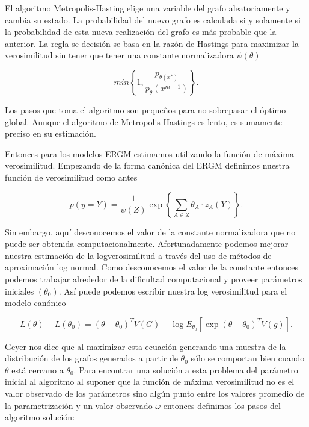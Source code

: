 El algoritmo Metropolis-Hasting elige una variable del grafo aleatoriamente y cambia su estado. La probabilidad del nuevo grafo es calculada si y solamente si la probabilidad de esta nueva realización del grafo es más probable que la anterior. La regla se decisión se basa en la razón de Hastings para maximizar la verosimilitud sin tener que tener una constante normalizadora $\psi(\theta)$

\begin{equation*}
    min \left\{1, \dfrac{p_{\theta(x^{*})}}{p_{\theta}(x^{m-1})}\right\}.
\end{equation*}

Los pasos que toma el algoritmo son pequeños para no sobrepasar el óptimo global. Aunque el algoritmo de Metropolis-Hastings es lento, es sumamente preciso en su estimación. 

Entonces para los modelos ERGM estimamos utilizando la función de máxima verosimilitud. Empezando de la forma canónica del ERGM definimos nuestra función de verosimilitud como antes

\begin{equation}
    p(y=Y)=\frac{1}{\psi(Z)} \exp \left\{\sum_{A \in Z} \theta_{A} \cdot z_{A}(Y)\right\}.
\end{equation}

Sin embargo, aquí desconocemos el valor de la constante normalizadora que no puede ser obtenida computacionalmente. Afortunadamente podemos mejorar nuestra estimación de la logverosimilitud a través del uso de métodos de aproximación log normal. Como desconocemos el valor de la constante entonces podemos trabajar alrededor de la dificultad computacional y proveer parámetros iniciales $(\theta_0)$. Así puede podemos escribir nuestra log verosimilitud para el modelo canónico \cite{RProject}

\begin{equation*}
    L(\theta)-L\left(\theta_{0}\right)=\left(\theta-\theta_{0}\right)^{T} V(G)-\log E_{\theta_{0}}\left[\exp \left(\theta-\theta_{0}\right)^{T} V(g)\right].
\end{equation*}

Geyer \cite{StochasticRelaxation} nos dice que al maximizar esta ecuación generando una muestra de la distribución de los grafos generados a partir de $\theta_0$ sólo se comportan bien cuando $\theta$ está cercano a $\theta_0$. Para encontrar una solución a esta problema del parámetro inicial al algoritmo al suponer que la función de máxima verosimilitud no es el valor observado de los parámetros sino algún punto entre los valores promedio de la parametrización y un valor observado $\omega$ entonces definimos los pasos del algoritmo solución: 

